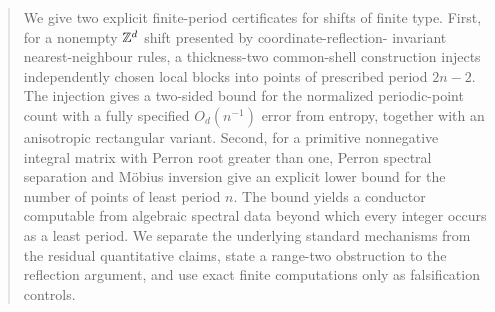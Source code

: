 \begin{abstract}
We give two explicit finite-period certificates for shifts of finite type.
First, for a nonempty $\ZZ^d$ shift presented by coordinate-reflection-
invariant nearest-neighbour rules, a thickness-two common-shell construction injects
independently chosen local blocks into points of prescribed period $2n-2$.
The injection gives a two-sided bound for the normalized periodic-point count
with a fully specified $O_d(n^{-1})$ error from entropy, together with an
anisotropic rectangular variant.  Second, for a primitive nonnegative
integral matrix with Perron root greater than one, Perron spectral separation
and M\"obius inversion give an explicit lower bound for the number of points
of least period $n$.  The bound yields a conductor computable from algebraic
spectral data beyond which every integer occurs as a least period.  We
separate the underlying standard mechanisms from the residual quantitative
claims, state a range-two obstruction to the reflection argument, and use
exact finite computations only as falsification controls.
\end{abstract}
